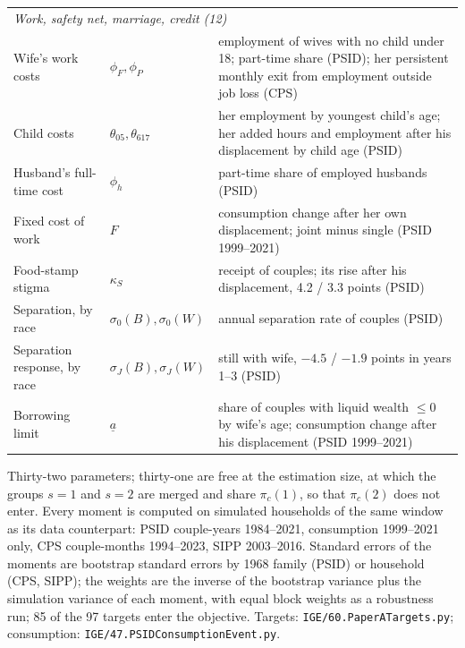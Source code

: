 \begin{table}[htbp]
\begin{tabular}{p{4.0cm}p{2.6cm}p{8.2cm}}
\multicolumn{3}{l}{\textit{Work, safety net, marriage, credit (12)}} \\
Wife's work costs & $\phi_F, \phi_P$ & employment of wives with no child under 18; part-time share (PSID); her persistent monthly exit from employment outside job loss (CPS) \\
Child costs & $\theta_{05}, \theta_{617}$ & her employment by youngest child's age; her added hours and employment after his displacement by child age (PSID) \\
Husband's full-time cost & $\phi_h$ & part-time share of employed husbands (PSID) \\
Fixed cost of work & $F$ & consumption change after her own displacement; joint minus single (PSID 1999--2021) \\
Food-stamp stigma & $\kappa_S$ & receipt of couples; its rise after his displacement, 4.2 / 3.3 points (PSID) \\
Separation, by race & $\sigma_0(B), \sigma_0(W)$ & annual separation rate of couples (PSID) \\
Separation response, by race & $\sigma_J(B), \sigma_J(W)$ & still with wife, $-4.5$ / $-1.9$ points in years 1--3 (PSID) \\
Borrowing limit & $\underline a$ & share of couples with liquid wealth $\le 0$ by wife's age; consumption change after his displacement (PSID 1999--2021) \\
\bottomrule
\end{tabular}
\begin{minipage}{0.95\textwidth}\footnotesize Thirty-two parameters; thirty-one are free at the estimation size, at which
the groups $s = 1$ and $s = 2$ are merged and share $\pi_c(1)$, so that $\pi_c(2)$ does not enter. Every moment is computed on simulated households of
the same window as its data counterpart: PSID couple-years 1984--2021, consumption 1999--2021 only, CPS couple-months
1994--2023, SIPP 2003--2016. Standard errors of the moments are bootstrap standard errors by 1968 family (PSID) or
household (CPS, SIPP); the weights are the inverse of the bootstrap variance plus the simulation variance of each
moment, with equal block weights as a robustness run; 85 of the 97 targets enter the objective. Targets:
\texttt{IGE/60.PaperATargets.py}; consumption: \texttt{IGE/47.PSIDConsumptionEvent.py}.\end{minipage}
\end{table}

